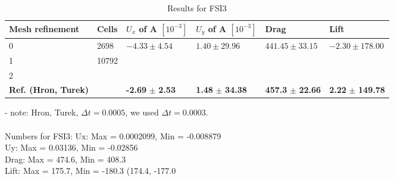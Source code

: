\begin{table}[!ht]
  \begin{center}
  \begin{tabular}{|l | l | l | l | l | l|} \hline
	Mesh refinement & Cells & $U_x$ of A $[10^{-3}]$ & $U_y$ of A $[10^{-3}]$ & Drag & Lift\\ \hline
    0  & 2698 & $ -4.33 \pm 4.54$ & $ 1.40 \pm 29.96$ & $441.45 \pm 33.15 $ & $-2.30 \pm 178.00$\\   \hline
    1 & 10792 & $ $&  $ $ & $ $ & $ $\\ \hline
    2 &  & $ $&  $ $ & $ $ & $ $   \\ \hline \hline
    \textbf{Ref. (Hron, Turek)}  & & \textbf{-2.69} $\pm$ \textbf{2.53} & \textbf{1.48} $\pm$ \textbf{34.38} & \textbf{457.3} $\pm$ \textbf{22.66} & \textbf{2.22} $\pm$ \textbf{149.78}\\ \hline 
    \hline

  \end{tabular}
	  \caption{Results for FSI3}
  \end{center}
\end{table}
- note: Hron, Turek, $\Delta t = 0.0005$, we used $\Delta t = 0.0003$. \\ \\
Numbers for FSI3:
Ux: Max = 0.0002099, Min = -0.008879 \\
Uy: Max = 0.03136, Min = -0.02856 \\
Drag: Max = 474.6, Min = 408.3 \\
Lift: Max = 175.7, Min = -180.3 (174.4, -177.0\\


